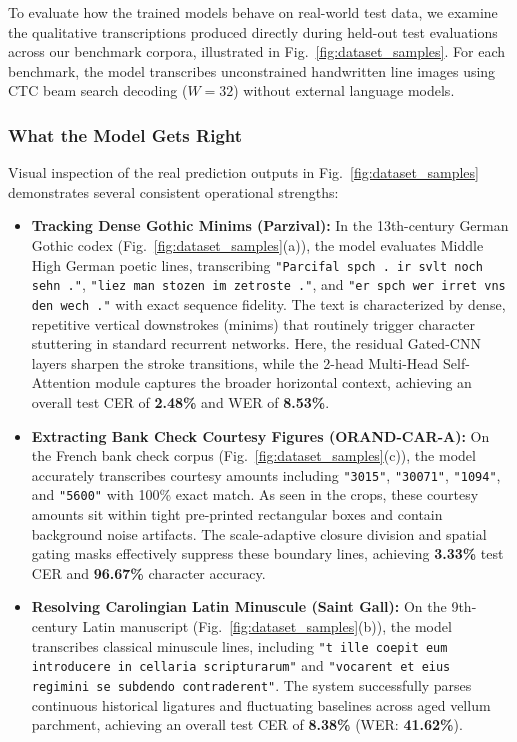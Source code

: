 \documentclass{IEEEtran}
\begin{document}
To evaluate how the trained models behave on real-world test data, we examine the qualitative transcriptions produced directly during held-out test evaluations across our benchmark corpora, illustrated in Fig.~\ref{fig:dataset_samples}. For each benchmark, the model transcribes unconstrained handwritten line images using CTC beam search decoding ($W=32$) without external language models.

\subsubsection{What the Model Gets Right}

Visual inspection of the real prediction outputs in Fig.~\ref{fig:dataset_samples} demonstrates several consistent operational strengths:

\begin{itemize}
    \item \textbf{Tracking Dense Gothic Minims (Parzival):} In the 13th-century German Gothic codex (Fig.~\ref{fig:dataset_samples}(a)), the model evaluates Middle High German poetic lines, transcribing \texttt{"Parcifal spch . ir svlt noch sehn ."}, \texttt{"liez man stozen im zetroste ."}, and \texttt{"er spch wer irret vns den wech ."} with exact sequence fidelity. The text is characterized by dense, repetitive vertical downstrokes (minims) that routinely trigger character stuttering in standard recurrent networks. Here, the residual Gated-CNN layers sharpen the stroke transitions, while the 2-head Multi-Head Self-Attention module captures the broader horizontal context, achieving an overall test CER of \textbf{2.48\%} and WER of \textbf{8.53\%}.
    
    \item \textbf{Extracting Bank Check Courtesy Figures (ORAND-CAR-A):} On the French bank check corpus (Fig.~\ref{fig:dataset_samples}(c)), the model accurately transcribes courtesy amounts including \texttt{"3015"}, \texttt{"30071"}, \texttt{"1094"}, and \texttt{"5600"} with 100\% exact match. As seen in the crops, these courtesy amounts sit within tight pre-printed rectangular boxes and contain background noise artifacts. The scale-adaptive closure division and spatial gating masks effectively suppress these boundary lines, achieving \textbf{3.33\%} test CER and \textbf{96.67\%} character accuracy.
    
    \item \textbf{Resolving Carolingian Latin Minuscule (Saint Gall):} On the 9th-century Latin manuscript (Fig.~\ref{fig:dataset_samples}(b)), the model transcribes classical minuscule lines, including \texttt{"t ille coepit eum introducere in cellaria scripturarum"} and \texttt{"vocarent et eius regimini se subdendo contraderent"}. The system successfully parses continuous historical ligatures and fluctuating baselines across aged vellum parchment, achieving an overall test CER of \textbf{8.38\%} (WER: \textbf{41.62\%}).
    

\end{itemize}
\end{document}
